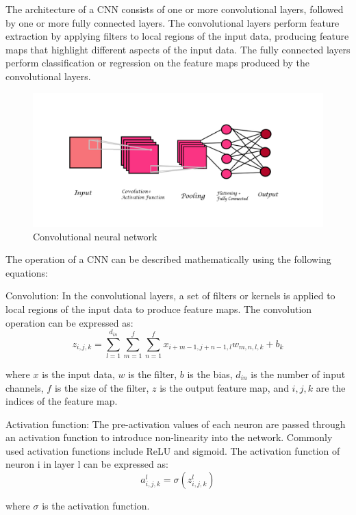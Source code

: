 \documentclass[a4paper]{sapthesis}
\begin{document}
The architecture of a CNN consists of one or more convolutional layers, 
followed by one or more fully connected layers. The convolutional layers 
perform feature extraction by applying filters to local regions of the 
input data, producing feature maps that highlight different aspects of 
the input data. The fully connected layers perform classification or
 regression on the feature maps produced by the convolutional layers.\newline
 \begin{figure}[h]
  \includegraphics[scale=0.5]{convolution_nn}
  \centering
  \caption{Convolutional neural network}\label{fig:convolution_nn}
  
  \end{figure}
The operation of a CNN can be described mathematically using the following
equations:

Convolution: In the convolutional layers, a set of filters or kernels is 
applied to local regions of the input data to produce feature maps. The 
convolution operation can be expressed as:
$$z_{i,j,k} = \sum_{l=1}^{d_{in}}\sum_{m=1}^{f}\sum_{n=1}^{f} x_{i+m-1,j+n-1,l}w_{m,n,l,k} + b_k$$

where $x$ is the input data, $w$ is the filter, $b$ is the bias, $d_{in}$ 
is the number of input channels, $f$ is the size of the filter, $z$ is the 
output feature map, and $i,j,k$ are the indices of the feature map.\newline

Activation function: The pre-activation values of each neuron are passed 
through an activation function to introduce non-linearity into the network.
 Commonly used activation functions include ReLU and sigmoid. The activation
  function of neuron i in layer l can be expressed as:
$$a_{i,j,k}^l = \sigma(z_{i,j,k}^l)$$

where $\sigma$ is the activation function.\newline
\end{document}
